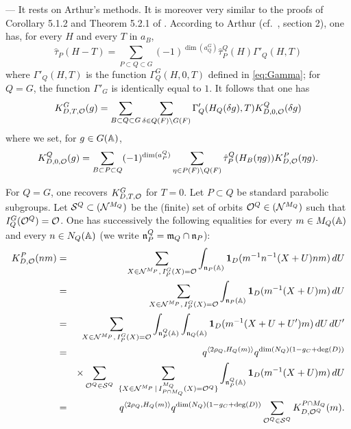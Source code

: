 \begin{paragr} --- \label{S:preuve-cor} It rests on Arthur's methods. It is moreover very similar to the proofs of Corollary 5.1.2 and Theorem 5.2.1 of \cite{scfh}. According to Arthur (cf.\ \cite{trace_inv}, section 2), one has, for every $H$ and every $T$ in $a_B$,
\begin{equation}
  \label{eq:tauhat-decomp}
  \hat{\tau}_P(H-T)=\sum_{P\subset Q\subset G} (-1)^{\dim(a_Q^G)} \hat{\tau}_P^Q(H) \Gamma'_Q(H,T)
\end{equation}
where $\Gamma'_Q(H,T)$ is the function $\Gamma_Q^G(H,0,T)$ defined in \eqref{eq:Gamma}; for $Q=G$, the function $\Gamma'_G$ is identically equal to $1$. It follows that one has
\begin{equation}
  \label{eq:KDTO-Gamma}
  K^G_{D,T,\mathcal{O}}(g)=\sum_{B\subset Q\subset G} \sum_{\delta\in Q(F)\backslash G(F)} \Gamma'_Q(H_Q(\delta g),T) K^Q_{D,0,\mathcal{O}}(\delta g)
\end{equation}
where we set, for $g\in G(\mathbb{A})$,
\begin{equation}
  \label{eq:KQD0O}
  K^Q_{D,0,\mathcal{O}}(g)=\sum_{B\subset P\subset Q} (-1)^{\dim(a_P^Q)} \sum_{\eta\in P(F)\backslash Q(F)} \hat{\tau}_P^Q(H_B(\eta g)) K^P_{D,\mathcal{O}}(\eta g).
\end{equation}

For $Q=G$, one recovers $K^G_{D,T,\mathcal{O}}$ for $T=0$. Let $P\subset Q$ be standard parabolic subgroups. Let $\mathcal{S}^Q\subset (\mathcal{N}^{M_Q})$ be the (finite) set of orbits $\mathcal{O}^Q\in (\mathcal{N}^{M_Q})$ such that $I_Q^G(\mathcal{O}^Q)=\mathcal{O}$. One has successively the following equalities for every $m\in M_Q(\mathbb{A})$ and every $n\in N_Q(\mathbb{A})$ (we write $\mathfrak{n}_P^Q=\mathfrak{m}_Q\cap \mathfrak{n}_P$):
\begin{eqnarray*}
  K^P_{D,\mathcal{O}}(nm)&=&\sum_{X\in \mathcal{N}^{M_P},\, I_P^G(X)=\mathcal{O}} \int_{\mathfrak{n}_P(\mathbb{A})} \mathbf{1}_D(m^{-1}n^{-1}(X+U)nm)\, dU\\
  &=&\sum_{X\in \mathcal{N}^{M_P},\, I_P^G(X)=\mathcal{O}} \int_{\mathfrak{n}_P(\mathbb{A})} \mathbf{1}_D(m^{-1}(X+U)m)\, dU\\
  &=&\sum_{X\in \mathcal{N}^{M_P},\, I_P^G(X)=\mathcal{O}} \int_{\mathfrak{n}_P^Q(\mathbb{A})} \int_{\mathfrak{n}_Q(\mathbb{A})} \mathbf{1}_D(m^{-1}(X+U+U')m)\, dU\, dU'\\
  &=& q^{\langle 2\rho_Q,H_Q(m)\rangle} q^{\dim(N_Q)(1-g_C+\deg(D))}\\
  &&\times \sum_{\mathcal{O}^Q\in \mathcal{S}^Q} \ \sum_{\{X\in \mathcal{N}^{M_P}\,|\, I^{M_Q}_{P\cap M_Q}(X)=\mathcal{O}^Q\}} \int_{\mathfrak{n}_P^Q(\mathbb{A})} \mathbf{1}_D(m^{-1}(X+U)m)\, dU\\
  &=& q^{\langle 2\rho_Q,H_Q(m)\rangle} q^{\dim(N_Q)(1-g_C+\deg(D))} \sum_{\mathcal{O}^Q\in \mathcal{S}^Q} K^{P\cap M_Q}_{D,\mathcal{O}^Q}(m).
\end{eqnarray*}


\end{paragr}
